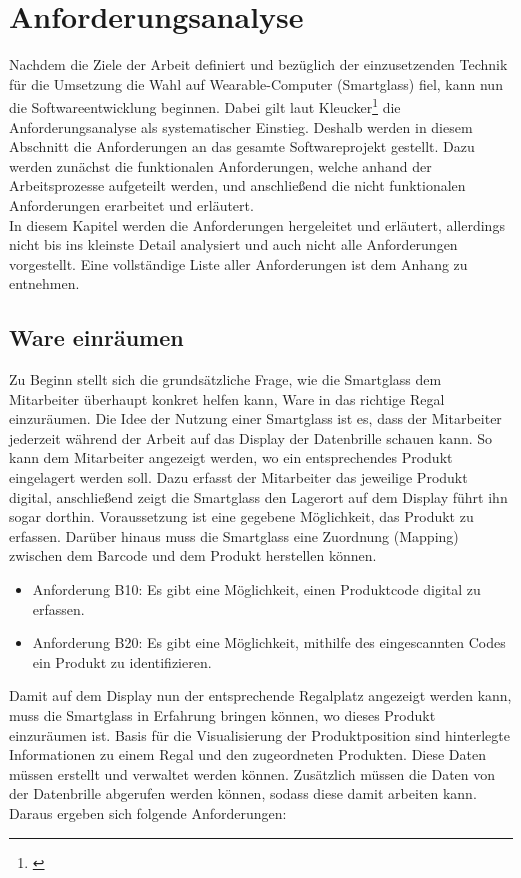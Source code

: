 \chapter{Anforderungsanalyse}
\label{annforderungnsanalyse}
Nachdem die Ziele der Arbeit definiert und bezüglich der einzusetzenden Technik für die Umsetzung die Wahl auf Wearable-Computer (Smartglass) fiel, kann nun die Softwareentwicklung beginnen. Dabei gilt laut Kleucker\footnote{\citep{anforderungsanalyse}} die Anforderungsanalyse als systematischer Einstieg. Deshalb werden in diesem Abschnitt die Anforderungen an das gesamte Softwareprojekt gestellt. Dazu werden zunächst die funktionalen Anforderungen, welche anhand der Arbeitsprozesse aufgeteilt werden, und anschließend die nicht funktionalen Anforderungen erarbeitet und erläutert.\\
In diesem Kapitel werden die Anforderungen hergeleitet und erläutert, allerdings nicht bis ins kleinste Detail analysiert und auch nicht alle Anforderungen vorgestellt. Eine vollständige Liste aller Anforderungen ist dem Anhang zu entnehmen.

\section{Ware einräumen}
Zu Beginn stellt sich die grundsätzliche Frage, wie die Smartglass dem Mitarbeiter überhaupt konkret helfen kann, Ware in das richtige Regal einzuräumen. Die Idee der Nutzung einer Smartglass ist es, dass der Mitarbeiter jederzeit während der Arbeit auf das Display der Datenbrille schauen kann. So kann dem Mitarbeiter angezeigt werden, wo ein entsprechendes Produkt eingelagert werden soll. Dazu erfasst der Mitarbeiter das jeweilige Produkt digital, anschließend zeigt die Smartglass den Lagerort auf dem Display \bzw führt ihn sogar dorthin. Voraussetzung ist eine gegebene Möglichkeit, das Produkt zu erfassen. Darüber hinaus muss die Smartglass eine Zuordnung (Mapping) zwischen dem Barcode und dem Produkt herstellen können.

\begin{itemize}
	\item Anforderung B10: Es gibt eine Möglichkeit, einen Produktcode digital zu erfassen. \label{anforderung_b10}
	\item Anforderung B20: Es gibt eine Möglichkeit, mithilfe des eingescannten Codes ein Produkt zu identifizieren. \label{anforderung_b20}
\end{itemize}

Damit auf dem Display nun der entsprechende Regalplatz angezeigt werden kann, muss die Smartglass in Erfahrung bringen können, wo dieses Produkt einzuräumen ist. Basis für die Visualisierung der Produktposition sind hinterlegte Informationen zu einem Regal und den zugeordneten Produkten. Diese Daten müssen erstellt und verwaltet werden können. Zusätzlich müssen die Daten von der Datenbrille abgerufen werden können, sodass diese damit arbeiten kann. Daraus ergeben sich folgende Anforderungen:

